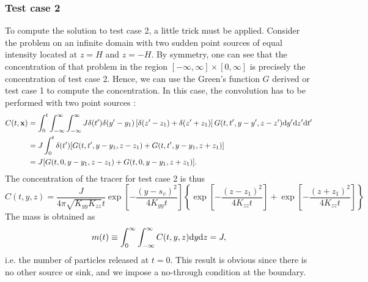 \subsubsection{Test case 2}
To compute the solution to test case 2, a little trick must be applied. Consider the problem on an infinite domain with two sudden point sources of equal intensity located at $z = H$ and $z = -H$. By symmetry, one can see that the concentration of that problem in the region $[-\infty, \infty] \times [0, \infty]$ is precisely the concentration of test case 2. Hence, we can use the Green's function $G$ derived or test case 1 to compute the concentration. In this case, the convolution has to be performed with two point sources :
\begin{align}
	C(t,\b x) &= \int_{0}^{t} \int_{-\infty}^{\infty} \int_{-\infty}^{\infty} J \delta(t') \delta(y'- y_1)\left[\delta(z'-z_1)+\delta(z'+z_1)\right] G(t,t',y-y',z-z') \rm dy' \rm dz' \rm dt' \nonumber\\
	&= J \int_{0}^{t} \delta(t')[G(t,t',y-y_1,z-z_1)+G(t,t',y-y_1,z+z_1)] \label{tc2_eq2} \nonumber\\
	&= J[G(t,0,y-y_1,z-z_1)+G(t,0,y-y_1,z+z_1)].
\end{align}
The concentration of the tracer for test case 2 is thus
\begin{equation}
	C(t,y,z) = \frac{J}{4\pi\sqrt{K_{yy}K_{zz}}t}\exp\left[-\frac{(y-s_v)^2}{4K_{yy}t}\right]\left\{\exp\left[-\frac{(z-z_1)^2}{4K_{zz}t} \right] + \exp\left[-\frac{(z+z_1)^2}{4K_{zz}t} \right] \right\}
\end{equation}
The mass is obtained as
\begin{equation}
	m(t) \equiv \int_{0}^{\infty} \int_{-\infty}^{\infty} C(t,y,z) \rm dy \rm dz = J,
\end{equation}
i.e. the number of particles released at $t=0$. This result is obvious since there is no other source or sink, and we impose a no-through condition at the boundary.

